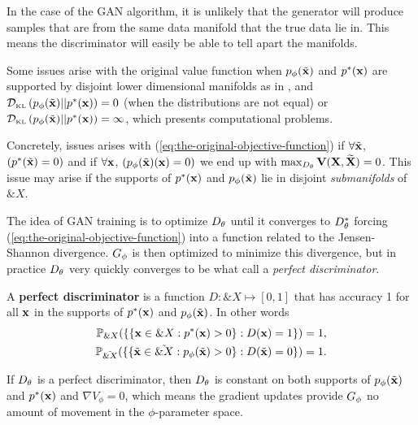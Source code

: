 In the case of the GAN algorithm, it is unlikely that the generator
will produce samples that are from the same data manifold that the
true data lie in. This means the discriminator will easily be able to
tell apart the manifolds.  %

Some issues arise with the original value function when $p_{\phi}(\tilde{\mathbf{x}})$ and
$p^*(\mathbf{x})$ are supported by disjoint lower dimensional manifolds as in
\cite{ref:arjovsky-towards-2017}, and $\mathcal{D}_{\text{\tiny KL}}\left( p_{\phi}(\tilde{\mathbf{x}}) \middle| \middle| p^*(\mathbf{x}) \right) = 0$ (when the
distributions are not equal) or $\mathcal{D}_{\text{\tiny KL}}\left( p_{\phi}(\tilde{\mathbf{x}}) \middle| \middle| p^*(\mathbf{x}) \right) = \infty$, which
presents computational problems.

Concretely, issues arises with
(\ref{eq:the-original-objective-function}) if $\forall \tilde{\mathbf{x}}$,
$(p^*(\tilde{\mathbf{x}}) = 0)$ and if $\forall \mathbf{x}$, $(p_{\phi}(\tilde{\mathbf{x}})(\mathbf{x}) = 0)$ we end
up with $\max_{D_\theta}\mathbf{V}(\mathbf{X}, \widetilde{\mathbf{X}}) = 0$. This issue may arise
if the supports of $p^*(\mathbf{x})$ and $p_{\phi}(\tilde{\mathbf{x}})$ lie in disjoint
\textit{submanifolds} of $\&X$.

The idea of GAN training is to optimize $D_\theta$ until it converges to
$D_\theta^*$ forcing (\ref{eq:the-original-objective-function}) into a
function related to the Jensen-Shannon divergence.  $G_\phi$ is then
optimized to minimize this divergence, but in practice $D_\theta$ very
quickly converges to be what \cite{ref:arjovsky-towards-2017} call a
\textit{perfect discriminator}.

\begin{definition} A \textbf{perfect discriminator} is a function $D:
  \&X \mapsto [0,1]$ that has accuracy 1 for all $\mathbf{x}$ in the supports
  of $p^*(\mathbf{x})$ and $p_{\phi}(\tilde{\mathbf{x}})$. In other words
  \begin{align} \mathbb{P}_{\&X}(\{\{\mathbf{x} \in \&X : p^*(\mathbf{x}) > 0\} : D(\mathbf{x})
    = 1 \} )= 1, \\ \mathbb{P}_{\tilde{\&X}}(\{\{\tilde{\mathbf{x}} \in
    \tilde{\&X} : p_{\phi}(\tilde{\mathbf{x}}) > 0\} : D(\tilde{\mathbf{x}}) = 0 \} )= 1.
  \end{align}
\end{definition}

\begin{theorem} If $D_\theta$ is a perfect discriminator, then $D_\theta$ is
  constant on both supports of $p_{\phi}(\tilde{\mathbf{x}})$ and $p^*(\mathbf{x})$ and $\nabla{V_\phi} = 0$,
  which means the gradient updates provide $G_\phi$ no amount of movement in
  the $\phi$-parameter space.
\end{theorem}

